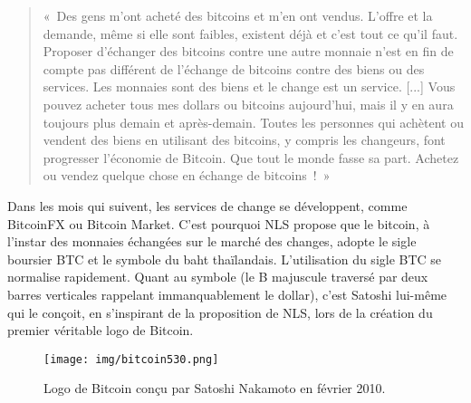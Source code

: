 \begin{quote}
«~Des gens m'ont acheté des bitcoins et m'en ont vendus. L'offre et la demande, même si elle sont faibles, existent déjà et c'est tout ce qu'il faut. Proposer d'échanger des bitcoins contre une autre monnaie n'est en fin de compte pas différent de l'échange de bitcoins contre des biens ou des services. Les monnaies sont des biens et le change est un service. [...] Vous pouvez acheter tous mes dollars ou bitcoins aujourd'hui, mais il y en aura toujours plus demain et après-demain. Toutes les personnes qui achètent ou vendent des biens en utilisant des bitcoins, y compris les changeurs, font progresser l'économie de Bitcoin. Que tout le monde fasse sa part. Achetez ou vendez quelque chose en échange de bitcoins~!~»
\end{quote}

Dans les mois qui suivent, les services de change se développent, comme BitcoinFX ou Bitcoin Market. C'est pourquoi NLS propose que le bitcoin, à l'instar des monnaies échangées sur le marché des changes, adopte le sigle boursier BTC et le symbole du baht thaïlandais. L'utilisation du sigle BTC se normalise rapidement. Quant au symbole (le B majuscule traversé par deux barres verticales rappelant immanquablement le dollar), c'est Satoshi lui-même qui le conçoit, en s'inspirant de la proposition de NLS, lors de la création du premier véritable logo de Bitcoin.

\begin{figure}[h]
  \centering
  \texttt{[image: img/bitcoin530.png]}
  \caption{Logo de Bitcoin conçu par Satoshi Nakamoto en février 2010.}
\end{figure}

